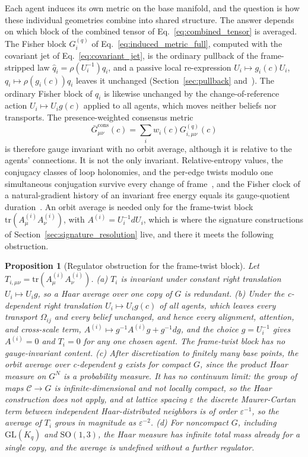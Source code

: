 \documentclass[11pt]{article}
\newtheorem{proposition}{Proposition}
\begin{document}
Each agent induces its own metric on the base manifold, and the question is how these individual geometries combine into shared structure. The answer depends on which block of the combined tensor of Eq.~\eqref{eq:combined_tensor} is averaged. The Fisher block $G^{(q)}_i$ of Eq.~\eqref{eq:induced_metric_full}, computed with the covariant jet of Eq.~\eqref{eq:covariant_jet}, is the ordinary pullback of the frame-stripped law $\hat q_i = \rho(U_i^{-1}) q_i$, and a passive local re-expression $U_i \mapsto g_i(c) U_i$, $q_i \mapsto \rho(g_i(c)) q_i$ leaves it unchanged (Section~\ref{sec:pullback} and~\cite[Ch.~B2]{DennisGaugeVFESuppB2026}). The ordinary Fisher block of $q_i$ is likewise unchanged by the change-of-reference action $U_i \mapsto U_i g(c)$ applied to all agents, which moves neither beliefs nor transports. The presence-weighted consensus metric
\begin{equation}
\bar{G}^{\mathrm{cons}}_{\mu\nu}(c) = \sum_i w_i(c) G^{(q)}_{i,\mu\nu}(c)
\label{eq:consensus_metric_covariant}
\end{equation}
is therefore gauge invariant with no orbit average, although it is relative to the agents' connections. It is not the only invariant. Relative-entropy values, the conjugacy classes of loop holonomies, and the per-edge twists modulo one simultaneous conjugation survive every change of frame~\cite[Ch.~14]{DennisGaugeVFE2026}, and the Fisher clock of a natural-gradient history of an invariant free energy equals its gauge-quotient duration~\cite[Ch.~7]{DennisGaugeVFE2026}. An orbit average is needed only for the frame-twist block $\mathrm{tr}(A^{(i)}_\mu A^{(i)}_\nu)$, with $A^{(i)} = U_i^{-1} dU_i$, which is where the signature constructions of Section~\ref{sec:signature_resolution} live, and there it meets the following obstruction.
\begin{proposition}[Regulator obstruction for the frame-twist block]\label{prop:regulator_obstruction}
Let $T_{i,\mu\nu} = \mathrm{tr}(A^{(i)}_\mu A^{(i)}_\nu)$.
(a) $T_i$ is invariant under constant right translation $U_i \mapsto U_i g$, so a Haar average over one copy of $G$ is redundant.
(b) Under the c-dependent right translation $U_i \mapsto U_i g(c)$ of all agents, which leaves every transport $\Omega_{ij}$ and every belief unchanged, and hence every alignment, attention, and cross-scale term, $A^{(i)} \mapsto g^{-1} A^{(i)} g + g^{-1} dg$, and the choice $g = U_i^{-1}$ gives $A^{(i)} = 0$ and $T_i = 0$ for any one chosen agent. The frame-twist block has no gauge-invariant content.
(c) After discretization to finitely many base points, the orbit average over c-dependent $g$ exists for compact $G$, since the product Haar measure on $G^N$ is a probability measure. It has no continuum limit: the group of maps $\mathcal{C} \to G$ is infinite-dimensional and not locally compact, so the Haar construction does not apply, and at lattice spacing $\varepsilon$ the discrete Maurer-Cartan term between independent Haar-distributed neighbors is of order $\varepsilon^{-1}$, so the average of $T_i$ grows in magnitude as $\varepsilon^{-2}$.
(d) For noncompact $G$, including $\mathrm{GL}(K_q)$ and $\mathrm{SO}(1,3)$, the Haar measure has infinite total mass already for a single copy, and the average is undefined without a further regulator.
\end{proposition}
\end{document}
